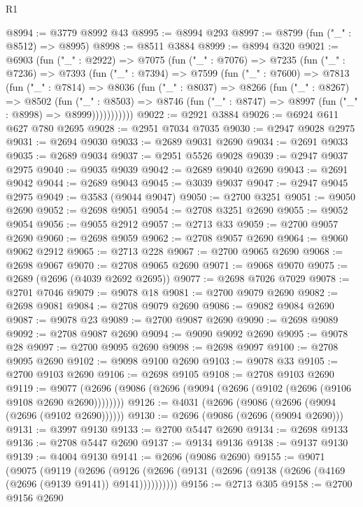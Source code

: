 \begin{lexlean}{R1}
\begin{coremodule}
@8994 := @3779 @8992 @43
@8995 := @8994 @293
@8997 := @8799 (fun ("_" : @8512) => @8995)
@8998 := @8511 @3884
@8999 := @8994 @320
@9021 := @6903
    (fun ("_" : @2922) =>
    @7075
      (fun ("_" : @7076) =>
      @7235
        (fun ("_" : @7236) =>
        @7393
          (fun ("_" : @7394) =>
          @7599
            (fun ("_" : @7600) =>
            @7813
              (fun ("_" : @7814) =>
              @8036
                (fun ("_" : @8037) =>
                @8266
                  (fun ("_" : @8267) =>
                  @8502
                    (fun ("_" : @8503) =>
                    @8746 (fun ("_" : @8747) => @8997 (fun ("_" : @8998) => @8999)))))))))))
@9022 := @2921 @3884
@9026 := @6924 @611 @627 @780 @2695
@9028 := @2951 @7034 @7035
@9030 := @2947 @9028 @2975
@9031 := @2694 @9030
@9033 := @2689 @9031 @2690
@9034 := @2691 @9033
@9035 := @2689 @9034
@9037 := @2951 @5526 @9028
@9039 := @2947 @9037 @2975
@9040 := @9035 @9039
@9042 := @2689 @9040 @2690
@9043 := @2691 @9042
@9044 := @2689 @9043
@9045 := @3039 @9037
@9047 := @2947 @9045 @2975
@9049 := @3583 (@9044 @9047)
@9050 := @2700 @3251
@9051 := @9050 @2690
@9052 := @2698 @9051
@9054 := @2708 @3251 @2690
@9055 := @9052 @9054
@9056 := @9055 @2912
@9057 := @2713 @33
@9059 := @2700 @9057 @2690
@9060 := @2698 @9059
@9062 := @2708 @9057 @2690
@9064 := @9060 @9062 @2912
@9065 := @2713 @228
@9067 := @2700 @9065 @2690
@9068 := @2698 @9067
@9070 := @2708 @9065 @2690
@9071 := @9068 @9070
@9075 := @2689 (@2696 (@4039 @2692 @2695))
@9077 := @2698 @7026 @7029
@9078 := @2701 @7046
@9079 := @9078 @18
@9081 := @2700 @9079 @2690
@9082 := @2698 @9081
@9084 := @2708 @9079 @2690
@9086 := @9082 @9084 @2690
@9087 := @9078 @23
@9089 := @2700 @9087 @2690
@9090 := @2698 @9089
@9092 := @2708 @9087 @2690
@9094 := @9090 @9092 @2690
@9095 := @9078 @28
@9097 := @2700 @9095 @2690
@9098 := @2698 @9097
@9100 := @2708 @9095 @2690
@9102 := @9098 @9100 @2690
@9103 := @9078 @33
@9105 := @2700 @9103 @2690
@9106 := @2698 @9105
@9108 := @2708 @9103 @2690
@9119 := @9077 (@2696 (@9086 (@2696 (@9094 (@2696 (@9102 (@2696 (@9106 @9108 @2690 @2690))))))))
@9126 := @4031 (@2696 (@9086 (@2696 (@9094 (@2696 (@9102 @2690))))))
@9130 := @2696 (@9086 (@2696 (@9094 @2690)))
@9131 := @3997 @9130
@9133 := @2700 @5447 @2690
@9134 := @2698 @9133
@9136 := @2708 @5447 @2690
@9137 := @9134 @9136
@9138 := @9137 @9130
@9139 := @4004 @9130
@9141 := @2696 (@9086 @2690)
@9155 := @9071
    (@9075
      (@9119
        (@2696
          (@9126 (@2696 (@9131 (@2696 (@9138 (@2696 (@4169 (@2696 (@9139 @9141)) @9141))))))))))
@9156 := @2713 @305
@9158 := @2700 @9156 @2690

\end{coremodule}
\end{lexlean}
